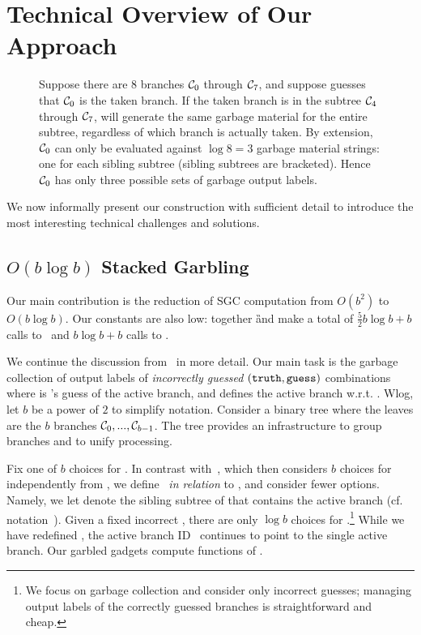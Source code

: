 
\section{Technical Overview of Our Approach}
\label{sec:techOverview}

\begin{figure*}[t]
  \centering
  
  \caption{%
    Suppose there are $8$ branches $\mathcal C_0$ through $\mathcal C_7$, and
    suppose \E guesses that $\mathcal C_0$ is the taken branch.
    If the taken branch is in the subtree $\mathcal C_4$ through $\mathcal C_7$,
    \E will generate the same garbage material for the entire subtree,
    regardless of which branch is actually taken.
    By extension, $\mathcal C_0$ can only be evaluated against $\log 8 = 3$ garbage
    material strings: one for each sibling subtree (sibling subtrees
    are bracketed). Hence $\mathcal C_0$ has only three possible sets of
    garbage output labels.
  }\label{fig:seed-tree}
\end{figure*}

We now informally present our construction with sufficient detail to introduce
the most interesting technical challenges and solutions.

\subsection{$O(b\log b)$ Stacked Garbling}
\label{sec:techOverviewSG}

Our main contribution is the reduction of SGC computation
from $O(b^2)$ to $O(b \log b)$.  Our constants are also
low: together \G and \E make a total of $\frac{5}{2} b \log b + b$ calls to \Gb\
and $b\log b + b$ calls  to \Ev.

We continue the discussion from~ in more detail.
Our main task is the garbage collection of output labels of {\em
incorrectly guessed} $(\mathtt{truth}, \mathtt{guess})$ combinations 
where
\guess is \E's guess of the active branch, and \truth defines the active branch w.r.t. \guess.
Wlog, let $b$ be a power of $2$ to simplify notation.
Consider a binary tree where the leaves are the $b$ branches
$\mathcal C_0,...,\mathcal C_{b-1}$.  The tree provides an infrastructure to group branches and to unify processing.


Fix one of $b$ choices for \guess.  In contrast with~\HK, which then considers $b$ choices for \truth independently from \guess, we define \truth\ {\em in relation} to \guess, and consider fewer \truth options.
Namely,
we  let \truth  denote the sibling subtree of \guess that contains the
active branch (cf. notation~\Cref{sec:intuition}). 
Given a fixed incorrect \guess, there are only $\log b$ choices for
\truth.\footnote{We focus on garbage collection and
consider only incorrect guesses;  managing output labels of the correctly guessed branches is straightforward and cheap.}
While we have redefined \truth, the active branch ID \aid\ continues
to point to the single active branch.
%
Our garbled gadgets compute functions of \aid.

